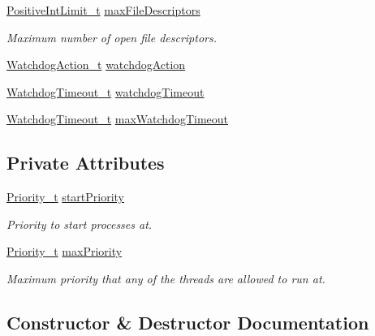 \begin{DoxyCompactItemize}
\hyperlink{structmodel_1_1_positive_int_limit__t}{Positive\+Int\+Limit\+\_\+t} \hyperlink{structmodel_1_1_process_env__t_aacbd1640bb653bcba809294c88f0884e}{max\+File\+Descriptors}
\begin{DoxyCompactList}\small\item\em Maximum number of open file descriptors. \end{DoxyCompactList}\item 
\hyperlink{classmodel_1_1_watchdog_action__t}{Watchdog\+Action\+\_\+t} \hyperlink{structmodel_1_1_process_env__t_a35f1bc1b58313ef7fdf17ab2414e5105}{watchdog\+Action}
\item 
\hyperlink{classmodel_1_1_watchdog_timeout__t}{Watchdog\+Timeout\+\_\+t} \hyperlink{structmodel_1_1_process_env__t_a84281b46dd841b2f32614de07423b45c}{watchdog\+Timeout}
\item 
\hyperlink{classmodel_1_1_watchdog_timeout__t}{Watchdog\+Timeout\+\_\+t} \hyperlink{structmodel_1_1_process_env__t_ad9cba2e832253c123b43ff047dd17f40}{max\+Watchdog\+Timeout}
\end{DoxyCompactItemize}
\subsection*{Private Attributes}
\begin{DoxyCompactItemize}
\item 
\hyperlink{classmodel_1_1_priority__t}{Priority\+\_\+t} \hyperlink{structmodel_1_1_process_env__t_a05c389421f1f8fae761ef38aa17415d4}{start\+Priority}
\begin{DoxyCompactList}\small\item\em Priority to start processes at. \end{DoxyCompactList}\item 
\hyperlink{classmodel_1_1_priority__t}{Priority\+\_\+t} \hyperlink{structmodel_1_1_process_env__t_a87af9ee041287c17fd4ae17db4e319ec}{max\+Priority}
\begin{DoxyCompactList}\small\item\em Maximum priority that any of the threads are allowed to run at. \end{DoxyCompactList}\end{DoxyCompactItemize}


\subsection{Constructor \& Destructor Documentation}
